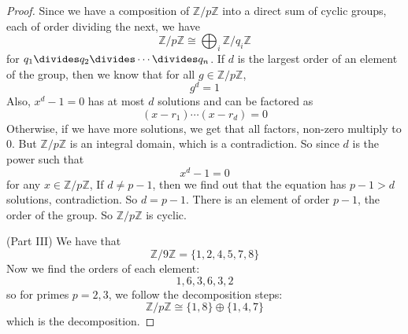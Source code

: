 \documentclass{article}
\begin{document}
\begin{proof}
        Since we have a composition of $\mathbb{Z}/p\mathbb{Z}$ into a direct sum of cyclic groups, each of order dividing the next, we have
            \begin{equation*}
                \mathbb{Z}/p\mathbb{Z} \cong \bigoplus_{i}\mathbb{Z}/q_{i}\mathbb{Z}
            \end{equation*}
        for $q_{1} \divides q_{2} \divides \cdots \divides q_{n}$. If $d$ is the largest order of an element of the group, then we know that for all $g \in\mathbb{Z}/p\mathbb{Z}$, 
            \begin{equation*}
                g^{d} = 1
            \end{equation*}
        Also, $x^{d} - 1 = 0$ has at most $d$ solutions and can be factored as
            \begin{equation*}
                (x - r_{1}) \cdots (x - r_{d}) = 0
            \end{equation*}
        Otherwise, if we have more solutions, we get that all factors, non-zero multiply to $0$. But $\mathbb{Z}/p\mathbb{Z}$ is an integral domain, which is a contradiction. So since $d$ is the power such that 
            \begin{equation*}
                x^{d} - 1 = 0
            \end{equation*}
        for any $x \in \mathbb{Z}/p\mathbb{Z}$, If $d \neq p - 1$, then we find out that the equation has $p - 1 > d$ solutions, contradiction. So $d = p - 1$. There is an element of order $p - 1$, the order of the group. So $\mathbb{Z}/p\mathbb{Z}$ is cyclic.

        (Part III) We have that
            \begin{equation*}
                \mathbb{Z}/9\mathbb{Z} = \{1, 2, 4, 5, 7, 8\}
            \end{equation*}
        Now we find the orders of each element:
            \begin{equation*}
                1, 6, 3, 6, 3, 2
            \end{equation*}
        so for primes $p = 2, 3$, we follow the decomposition steps:
            \begin{equation*}
                \mathbb{Z}/p\mathbb{Z} \cong \{1, 8\} \oplus \{1, 4, 7\}
            \end{equation*}
        which is the decomposition.
    \end{proof}
\end{document}
